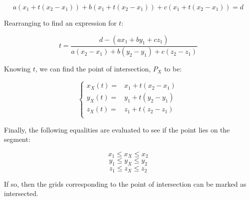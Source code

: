     $$a(x_1 + t(x_2 - x_1)) + b(x_1 + t(x_2 - x_1)) + c(x_1 + t(x_2 - x_1)) = d$$

Rearranging to find an expression for $t$:

    $$t = \frac{d - (ax_1 + by_1 + cz_1)}{a(x_2-x_1) + b(y_2-y_1) + c(z_2-z_1)}$$

Knowing $t$, we can find the point of intersection, $P_X$ to be:

    $$\begin{cases}
        x_X(t) = & x_1 + t(x_2 - x_1) \\
        y_X(t) = & y_1 + t(y_2 - y_1) \\
        z_X(t) = & z_1 + t(z_2 - z_1) \\
    \end{cases}$$

Finally, the following equalities are evaluated to see if the point lies on the segment:

    $$x_1 \leq x_X \leq x_2$$
    $$y_1 \leq y_X \leq y_2$$
    $$z_1 \leq z_X \leq z_2$$

If so, then the grids corresponding to the point of intersection can be marked as intersected.
